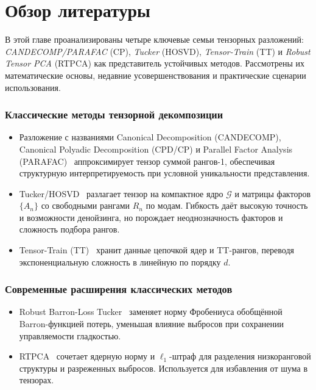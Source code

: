 \chapter{Обзор литературы}
\label{chap:lr}

В этой главе проанализированы четыре ключевые семьи тензорных разложений: \emph{CANDECOMP/PARAFAC} (CP), \emph{Tucker} (HOSVD), \emph{Tensor-Train} (TT) и \emph{Robust Tensor PCA} (RTPCA) как представитель устойчивых методов. Рассмотрены их математические основы, недавние усовершенствования и практические сценарии использования.

\subsection*{Классические методы тензорной декомпозиции}

\begingroup
\sloppy
\begin{itemize}\setlength\itemsep{0.25em}
    \item Разложение с названиями Canonical Decomposition (CANDECOMP), Canonical Polyadic Decomposition (CPD/CP) и Parallel Factor Analysis (PARAFAC)~\cite{Hitchcock1927, Carroll1970} аппроксимирует тензор суммой рангов-1, обеспечивая структурную интерпретируемость при условной уникальности представления.
    \item Tucker/HOSVD~\cite{tucker_method} разлагает тензор на компактное ядро \( \mathcal{G} \) и матрицы факторов \(\{A_n\}\) со свободными рангами \(R_n\) по модам. Гибкость даёт высокую точность и возможности денойзинга, но порождает неоднозначность факторов и сложность подбора рангов.
    \item Tensor-Train (TT)~\cite{tensorly_tensor_train} хранит данные цепочкой ядер и TT-рангов, переводя экспоненциальную сложность в линейную по порядку \(d\).
\end{itemize}
\endgroup

\subsection*{Современные расширения классических методов}

\begin{itemize}\setlength\itemsep{0.25em}
    \item Robust Barron-Loss Tucker~\cite{barron_loss_tensor_decomposition} заменяет норму Фробениуса обобщённой Barron-функцией потерь, уменьшая влияние выбросов при сохранении управляемости гладкостью.
    \item RTPCA~\cite{rtpca_method} сочетает ядерную норму и $\ell_1$-штраф для разделения низкоранговой структуры и разреженных выбросов. Используется для избавления от шума в тензорах.
\end{itemize}

